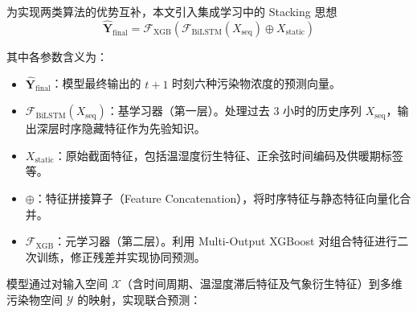 \documentclass[a4paper, 12pt]{ctexart} %
\begin{document}
为实现两类算法的优势互补，本文引入集成学习中的 Stacking 思想
\begin{equation}
 \mathbf{\hat{Y}}_{\text{final}} = \mathcal{F}_{\text{XGB}} \left( \mathcal{F}_{\text{BiLSTM}}(X_{\text{seq}}) \oplus X_{\text{static}} \right)
\end{equation}

其中各参数含义为：
\begin{itemize}[itemsep=0pt, parsep=0pt, topsep=0pt]
\item $\mathbf{\hat{Y}}_{\text{final}}$：模型最终输出的 $t+1$ 时刻六种污染物浓度的预测向量。
\item $\mathcal{F}_{\text{BiLSTM}}(X_{\text{seq}})$：基学习器（第一层）。处理过去 3 小时的历史序列 $X_{\text{seq}}$，输出深层时序隐藏特征作为先验知识。
\item $X_{\text{static}}$：原始截面特征，包括温湿度衍生特征、正余弦时间编码及供暖期标签等。
\item $\oplus$：特征拼接算子（Feature Concatenation），将时序特征与静态特征向量化合并。
\item $\mathcal{F}_{\text{XGB}}$：元学习器（第二层）。利用 Multi-Output XGBoost 对组合特征进行二次训练，修正残差并实现协同预测。
\end{itemize}




模型通过对输入空间 $\mathcal{X}$（含时间周期、温湿度滞后特征及气象衍生特征）到多维污染物空间 $\mathcal{Y}$ 的映射，实现联合预测：
\end{document}
